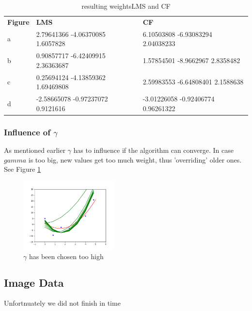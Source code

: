 \begin{table}[]
\begin{tabular}{lll}
\textbf{Figure} & \textbf{LMS} & \textbf{CF} \\
a               &        2.79641366 -4.06370085  1.6057828       &     6.10503808 -6.93083294  2.04038233       \\
b               &      0.90857717 -6.42409915  2.36363687        &     1.57854501 -8.9662967   2.8358482          \\
c               &        0.25694124 -4.13859362  1.69469808      &        2.59983553 -6.64808401  2.1588638         \\
d               &        -2.58665078 -0.97237072  0.9121616       &         -3.01226058 -0.92406774  0.96261322        \\
\end{tabular}
\caption{\label{tab:weights}resulting weights{LMS} and {CF}}
\end{table}


\subsubsection{Influence of $\gamma$ }

As mentioned earlier $\gamma$ has to influence if the algorithm can converge. In case $gamma$ is too big, new values get too much weight, thus 'overriding' older ones. See Figure \ref {fig:gamma}

\begin{figure}[!h]
\begin{center}
\centering
\includegraphics[width=5cm]{fig_gamma.png}
\end{center}
\caption{\label{fig:gamma} $\gamma$ has been chosen too high }
\end{figure}




\subsection{Image Data}
Unfortnuately we did not finish in time 


